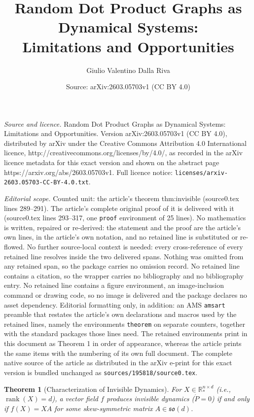 \documentclass[10pt,a4paper]{amsart}
\title{Random Dot Product Graphs as Dynamical Systems: \\ Limitations and Opportunities}
\author{Giulio Valentino Dalla Riva}
\date{Source: arXiv:2603.05703v1 (CC BY 4.0)}
\newtheorem{theorem}{Theorem}
\newcommand{\RR}{\mathbb{R}}
\DeclareMathOperator{\rank}{rank}
\newcommand{\so}{\mathfrak{so}}
\begin{document}
\maketitle

\noindent\emph{Source and licence.} Random Dot Product Graphs as Dynamical Systems: \\ Limitations and Opportunities. Version arXiv:2603.05703v1 (CC BY 4.0), distributed by arXiv under the Creative Commons Attribution 4.0 International licence, http://creativecommons.org/licenses/by/4.0/, as recorded in the arXiv licence metadata for this exact version and shown on the abstract page https://arxiv.org/abs/2603.05703v1. Full licence notice: \texttt{licenses/arxiv-2603.05703-CC-BY-4.0.txt}.\par\smallskip

\noindent\textit{Editorial scope.} Counted unit: the article's theorem thm:invisible (source0.tex lines 289--291). The article's complete original proof of it is delivered with it (source0.tex lines 293--317, one \texttt{proof} environment of 25 lines). No mathematics is written, repaired or re-derived: the statement and the proof are the article's own lines, in the article's own notation, and no retained line is substituted or re-flowed.  No further source-local context is needed: every cross-reference of every retained line resolves inside the two delivered spans.  Nothing was omitted from any retained span, so the package carries no omission record.  No retained line contains a citation, so the wrapper carries no bibliography and no bibliography entry.  No retained line contains a figure environment, an image-inclusion command or drawing code, so no image is delivered and the package declares no asset dependency.  Editorial formatting only, in addition: an AMS \texttt{amsart} preamble that restates the article's own declarations and macros used by the retained lines, namely the environments \texttt{theorem} on separate counters, together with the standard packages those lines need.  The retained environments print in this document as Theorem 1 in order of appearance, whereas the article prints the same items with the numbering of its own full document.  The complete native source of the article as distributed in the arXiv e-print for this exact version is bundled unchanged as \texttt{sources/195818/source0.tex}.
\begin{theorem}[Characterization of Invisible Dynamics]\label{thm:invisible}
For $X \in \RR_*^{n \times d}$ (i.e., $\rank(X) = d$), a vector field $f$ produces invisible dynamics ($\dot{P} = 0$) if and only if $f(X) = XA$ for some skew-symmetric matrix $A \in \so(d)$.
\end{theorem}
\end{document}
